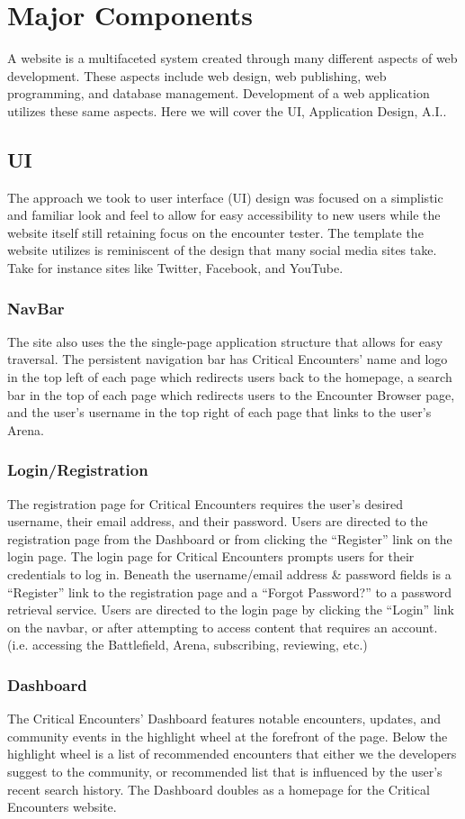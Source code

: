 \documentclass[letterpaper, 10 pt, conference]{ieeeconf}
\begin{document}
\section{Major Components}
A website is a multifaceted system created through many different aspects of web development. These aspects include web design, web publishing, web programming, and database management. Development of a web application utilizes these same aspects. Here we will cover the UI, Application Design, A.I..
\subsection{UI}
The approach we took to user interface (UI) design was focused on a simplistic
and familiar look and feel to allow for easy accessibility to new users while the
website itself still retaining focus on the encounter tester. The template the website
utilizes is reminiscent of the design that many social media sites take. Take for
instance sites like Twitter, Facebook, and YouTube.
\subsubsection{NavBar}
The site also uses the the single-page application structure that allows for easy
traversal. The persistent navigation bar has Critical Encounters’
name and logo in the top left of each page which redirects users back to the homepage,
a search bar in the top of each page which redirects users to the Encounter
Browser page, and the user’s username in the top right of each page that links to
the user’s Arena.
\subsubsection{Login/Registration}
The registration page for Critical Encounters requires the user’s
desired username, their email address, and their password. Users are directed to
the registration page from the Dashboard or from clicking the “Register” link on
the login page. The login page for Critical Encounters prompts users for their
credentials to log in. Beneath the username/email address \& password fields is a
“Register” link to the registration page and a “Forgot Password?” to a password
retrieval service. Users are directed to the login page by clicking the “Login” link
on the navbar, or after attempting to access content that requires an account. (i.e.
accessing the Battlefield, Arena, subscribing, reviewing, etc.)
\subsubsection{Dashboard}
The Critical Encounters’ Dashboard features notable encounters,
updates, and community events in the highlight wheel at the forefront of the page.
Below the highlight wheel is a list of recommended encounters that either we the
developers suggest to the community, or recommended list that is influenced by
the user’s recent search history.
The Dashboard doubles as a homepage for the Critical Encounters website.
\end{document}
